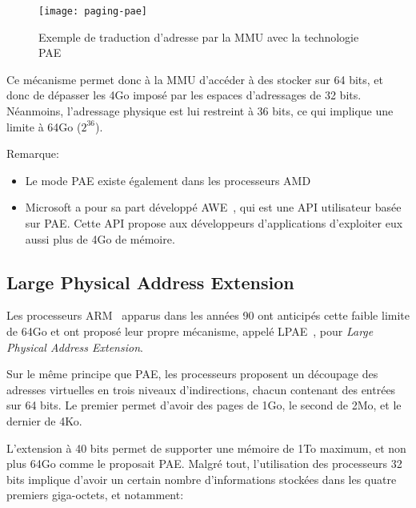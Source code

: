       \begin{figure}[h]
        \centering \texttt{[image: paging-pae]}
        \caption{Exemple de traduction d'adresse par la MMU avec la technologie
          PAE}
        \label{fig:paging-pae}
      \end{figure}
      
      Ce mécanisme permet donc à la MMU d'accéder à des stocker sur 64 bits, et
      donc de dépasser les 4Go imposé par les espaces d'adressages de 32
      bits. Néanmoins, l'adressage physique est lui restreint à 36 bits, ce qui
      implique une limite à 64Go ($2^{36}$).

      \begin{paragraph}{Remarque:}
        \begin{itemize}
          \item Le mode PAE existe également dans les processeurs
            AMD~\citep{amd2000system}
          \item Microsoft a pour sa part développé
            AWE~\citep{russinovich2012windows}, qui est une API utilisateur
            basée sur PAE. Cette API propose aux développeurs d'applications
            d'exploiter eux aussi plus de 4Go de mémoire.
        \end{itemize}
      \end{paragraph}


    \subsection{Large Physical Address Extension}

    Les processeurs ARM~\cite{arm1990web} apparus dans les années 90 ont
    anticipés cette faible limite de 64Go et ont proposé leur propre mécanisme,
    appelé LPAE~\citep{arm2012principles,marinas2011linux}, pour \textit{Large
      Physical Address Extension}.

    Sur le même principe que PAE, les processeurs proposent un découpage des
    adresses virtuelles en trois niveaux d'indirections, chacun contenant des
    entrées sur 64 bits. Le premier permet d'avoir des pages de 1Go, le second
    de 2Mo, et le dernier de 4Ko.

    L'extension à 40 bits permet de supporter une mémoire de 1To maximum, et non
    plus 64Go comme le proposait PAE. Malgré tout, l'utilisation des processeurs
    32 bits implique d'avoir un certain nombre d'informations stockées dans les
    quatre premiers giga-octets, et notamment:

